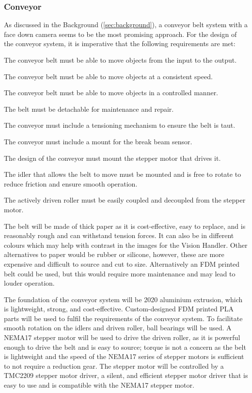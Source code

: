 \subsubsection{Conveyor}
\label{sec:conveyor-design}
As discussed in the Background (\autoref{sec:background}), a conveyor belt system with a face down camera seems to be the most promising approach. For the design of the conveyor system, it is imperative that the following requirements are met:
\begin{mylist}
    \item The conveyor belt must be able to move objects from the input to the output.
    \item The conveyor belt must be able to move objects at a consistent speed.
    \item The conveyor belt must be able to move objects in a controlled manner.
    \item The belt must be detachable for maintenance and repair.
    \item The conveyor must include a tensioning mechanism to ensure the belt is taut.
    \item The conveyor must include a mount for the break beam sensor.
    \item The design of the conveyor must mount the stepper motor that drives it.
    \item The idler that allows the belt to move must be mounted and is free to rotate to reduce friction and ensure smooth operation.
    \item The actively driven roller must be easily coupled and decoupled from the stepper motor.
\end{mylist}

The belt will be made of thick paper as it is cost-effective, easy to replace, and is reasonably rough and can withstand tension forces. It can also be in different colours which may help with contrast in the images for the Vision Handler. Other alternatives to paper would be rubber or silicone, however, these are more expensive and difficult to source and cut to size. Alternatively an FDM printed belt could be used, but this would require more maintenance and may lead to louder operation.

The foundation of the conveyor system will be 2020 aluminium extrusion, which is lightweight, strong, and cost-effective. Custom-designed FDM printed PLA parts will be used to fulfil the requirements of the conveyor system. To facilitate smooth rotation on the idlers and driven roller, ball bearings will be used. A NEMA17 stepper motor will be used to drive the driven roller, as it is powerful enough to drive the belt and is easy to source; torque is not a concern as the belt is lightweight and the speed of the NEMA17 series of stepper motors is sufficient to not require a reduction gear. The stepper motor will be controlled by a TMC2209 stepper motor driver, a silent, and efficient stepper motor driver that is easy to use and is compatible with the NEMA17 stepper motor.

